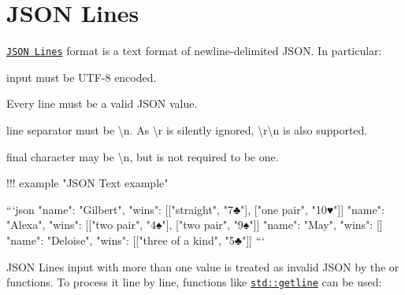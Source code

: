 \chapter{JSON Lines }
\hypertarget{md_include_2nlohman_2json-develop_2docs_2mkdocs_2docs_2features_2parsing_2json__lines}{}\label{md_include_2nlohman_2json-develop_2docs_2mkdocs_2docs_2features_2parsing_2json__lines}
\label{md_include_2nlohman_2json-develop_2docs_2mkdocs_2docs_2features_2parsing_2json__lines_autotoc_md1500}%
%


 \href{https://jsonlines.org}{\texttt{JSON Lines}} format is a text format of newline-\/delimited JSON. In particular:\+


\begin{DoxyEnumerate}
\item {} input must be UTF-\/8 encoded.
\item Every line must be a valid JSON value.
\item {} line separator must be {\ttfamily \textbackslash{}n}. As {\ttfamily \textbackslash{}r} is silently ignored, {\ttfamily \textbackslash{}r\textbackslash{}n} is also supported.
\item {} final character may be {\ttfamily \textbackslash{}n}, but is not required to be one.
\end{DoxyEnumerate}

!!! example "{}\+JSON Text example"{} \begin{DoxyVerb}```json
{"name": "Gilbert", "wins": [["straight", "7♣"], ["one pair", "10♥"]]}
{"name": "Alexa", "wins": [["two pair", "4♠"], ["two pair", "9♠"]]}
{"name": "May", "wins": []}
{"name": "Deloise", "wins": [["three of a kind", "5♣"]]}
```
\end{DoxyVerb}


JSON Lines input with more than one value is treated as invalid JSON by the  or  functions. To process it line by line, functions like \href{https://en.cppreference.com/w/cpp/string/basic_string/getline}{\texttt{{\ttfamily std::\+getline}}} can be used:\+

